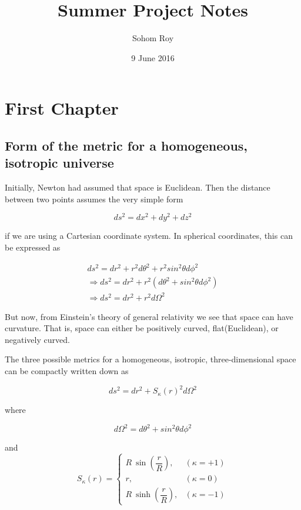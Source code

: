 \documentclass[a4,12pt,oneside]{report}
\begin{document}
	\title{Summer Project Notes}
	\date{9 June 2016}
	\author{Sohom Roy}
	\maketitle
	
	
	\tableofcontents

	
	\chapter{First Chapter}
	
	\section{Form of the metric for a homogeneous, isotropic universe}
	
	Initially, Newton had assumed that space is Euclidean. Then the distance between two points assumes the very simple form
	
	\begin{equation}
		ds^2=dx^2+dy^2+dz^2
	\end{equation}
	
	if we are using a Cartesian coordinate system. In spherical coordinates, this can be expressed as

	\begin{align}
	ds^2=dr^2+ r^2d\theta^2 + r^2sin^2\theta d\phi^2	\\
	\Rightarrow ds^2=dr^2+ r^2(d\theta^2+sin^2\theta d\phi^2) \\
	\Rightarrow ds^2=dr^2+ r^2d\Omega^2 
	\end{align}
	
	But now, from Einstein's theory of general relativity we see that space can have curvature. That is, space can either be positively curved, flat(Euclidean), or negatively curved.
	
	The three possible metrics for a homogeneous, isotropic, three-dimensional space can be compactly written down as
	
	\begin{equation}
	    ds^2=dr^2+S_\kappa(r)^2d\Omega^2
	\end{equation}
	
	where 
	
	\begin{equation}
		d\Omega^2=d\theta^2+sin^2\theta d\phi^2
	\end{equation}
	
	and 
	\begin{equation}
		S_\kappa(r)=\begin{cases}R\:\sin\left(\dfrac{r}{R}\right),   &(\kappa=+1) \\
		r,  &(\kappa=0) \\
		R\:\sinh\left(\dfrac{r}{R}\right),  &(\kappa=-1)
		\end{cases}
	\end{equation}
	
\end{document}
